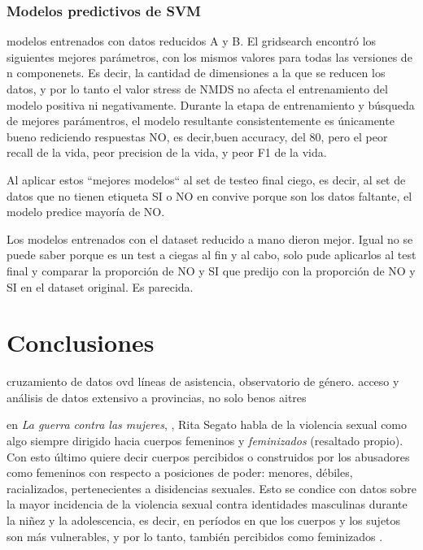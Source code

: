 \documentclass[10 pt]{article}
\begin{document}
\subsubsection{Modelos predictivos de SVM}

modelos entrenados con datos reducidos A y B. El gridsearch encontró los siguientes mejores parámetros, con los mismos valores para todas las versiones de n componenets. Es decir, la cantidad de dimensiones a la que se reducen los datos, y por lo tanto el valor stress de NMDS no afecta el entrenamiento del modelo positiva ni negativamente. Durante la etapa de entrenamiento y búsqueda de mejores parámentros, el modelo resultante consistentemente es únicamente bueno rediciendo respuestas NO, es decir,buen accuracy, del 80, pero el peor recall de la vida, peor precision de la vida, y peor F1 de la vida.

Al aplicar estos “mejores modelos“ al set de testeo final ciego, es decir, al set de datos que no tienen etiqueta SI o NO en convive porque son los datos faltante, el modelo predice mayoría de NO.


Los modelos entrenados con el dataset reducido a mano dieron mejor. Igual no se puede saber porque es un test a ciegas al fin y al cabo, solo pude aplicarlos al test final y comparar la proporción de NO y SI que predijo con la proporción de NO y SI en el dataset original. Es parecida.

\section{Conclusiones}\label{conc}
cruzamiento de datos ovd líneas de asistencia, observatorio de género.
acceso y análisis de datos extensivo a provincias, no solo benos aitres



en \textit{La guerra contra las mujeres}, \citeyearpar{segato2016guerra}, Rita Segato habla de la violencia sexual como algo siempre dirigido hacia cuerpos femeninos y \textit{feminizados} (resaltado propio). Con esto último quiere decir cuerpos percibidos o construidos por los abusadores como femeninos con respecto a posiciones de poder: menores, débiles, racializados, pertenecientes a disidencias sexuales. Esto se condice con datos sobre la mayor incidencia de la violencia sexual contra identidades masculinas durante la niñez y la adolescencia, es decir, en períodos en que los cuerpos y los sujetos son más vulnerables, y por lo tanto, también percibidos como feminizados \citep*{contreras2016violencia,ufem_relevamiento,ferris2002world}.
\end{document}
